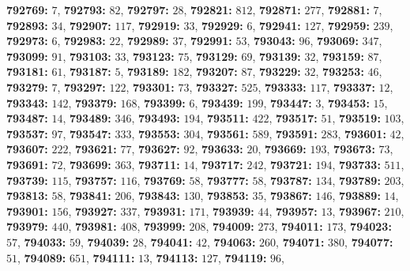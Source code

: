 \textsf{\bfseries 792769:} $7$, \textsf{\bfseries 792793:} $82$, \textsf{\bfseries 792797:} $28$, \textsf{\bfseries 792821:} $812$, \textsf{\bfseries 792871:} $277$, \textsf{\bfseries 792881:} $7$, \textsf{\bfseries 792893:} $34$, \textsf{\bfseries 792907:} $117$, \textsf{\bfseries 792919:} $33$, \textsf{\bfseries 792929:} $6$, \textsf{\bfseries 792941:} $127$, \textsf{\bfseries 792959:} $239$, \textsf{\bfseries 792973:} $6$, \textsf{\bfseries 792983:} $22$, \textsf{\bfseries 792989:} $37$, \textsf{\bfseries 792991:} $53$, \textsf{\bfseries 793043:} $96$, \textsf{\bfseries 793069:} $347$, \textsf{\bfseries 793099:} $91$, \textsf{\bfseries 793103:} $33$, \textsf{\bfseries 793123:} $75$, \textsf{\bfseries 793129:} $69$, \textsf{\bfseries 793139:} $32$, \textsf{\bfseries 793159:} $87$, \textsf{\bfseries 793181:} $61$, \textsf{\bfseries 793187:} $5$, \textsf{\bfseries 793189:} $182$, \textsf{\bfseries 793207:} $87$, \textsf{\bfseries 793229:} $32$, \textsf{\bfseries 793253:} $46$, \textsf{\bfseries 793279:} $7$, \textsf{\bfseries 793297:} $122$, \textsf{\bfseries 793301:} $73$, \textsf{\bfseries 793327:} $525$, \textsf{\bfseries 793333:} $117$, \textsf{\bfseries 793337:} $12$, \textsf{\bfseries 793343:} $142$, \textsf{\bfseries 793379:} $168$, \textsf{\bfseries 793399:} $6$, \textsf{\bfseries 793439:} $199$, \textsf{\bfseries 793447:} $3$, \textsf{\bfseries 793453:} $15$, \textsf{\bfseries 793487:} $14$, \textsf{\bfseries 793489:} $346$, \textsf{\bfseries 793493:} $194$, \textsf{\bfseries 793511:} $422$, \textsf{\bfseries 793517:} $51$, \textsf{\bfseries 793519:} $103$, \textsf{\bfseries 793537:} $97$, \textsf{\bfseries 793547:} $333$, \textsf{\bfseries 793553:} $304$, \textsf{\bfseries 793561:} $589$, \textsf{\bfseries 793591:} $283$, \textsf{\bfseries 793601:} $42$, \textsf{\bfseries 793607:} $222$, \textsf{\bfseries 793621:} $77$, \textsf{\bfseries 793627:} $92$, \textsf{\bfseries 793633:} $20$, \textsf{\bfseries 793669:} $193$, \textsf{\bfseries 793673:} $73$, \textsf{\bfseries 793691:} $72$, \textsf{\bfseries 793699:} $363$, \textsf{\bfseries 793711:} $14$, \textsf{\bfseries 793717:} $242$, \textsf{\bfseries 793721:} $194$, \textsf{\bfseries 793733:} $511$, \textsf{\bfseries 793739:} $115$, \textsf{\bfseries 793757:} $116$, \textsf{\bfseries 793769:} $58$, \textsf{\bfseries 793777:} $58$, \textsf{\bfseries 793787:} $134$, \textsf{\bfseries 793789:} $203$, \textsf{\bfseries 793813:} $58$, \textsf{\bfseries 793841:} $206$, \textsf{\bfseries 793843:} $130$, \textsf{\bfseries 793853:} $35$, \textsf{\bfseries 793867:} $146$, \textsf{\bfseries 793889:} $14$, \textsf{\bfseries 793901:} $156$, \textsf{\bfseries 793927:} $337$, \textsf{\bfseries 793931:} $171$, \textsf{\bfseries 793939:} $44$, \textsf{\bfseries 793957:} $13$, \textsf{\bfseries 793967:} $210$, \textsf{\bfseries 793979:} $440$, \textsf{\bfseries 793981:} $408$, \textsf{\bfseries 793999:} $208$, \textsf{\bfseries 794009:} $273$, \textsf{\bfseries 794011:} $173$, \textsf{\bfseries 794023:} $57$, \textsf{\bfseries 794033:} $59$, \textsf{\bfseries 794039:} $28$, \textsf{\bfseries 794041:} $42$, \textsf{\bfseries 794063:} $260$, \textsf{\bfseries 794071:} $380$, \textsf{\bfseries 794077:} $51$, \textsf{\bfseries 794089:} $651$, \textsf{\bfseries 794111:} $13$, \textsf{\bfseries 794113:} $127$, \textsf{\bfseries 794119:} $96$, 

